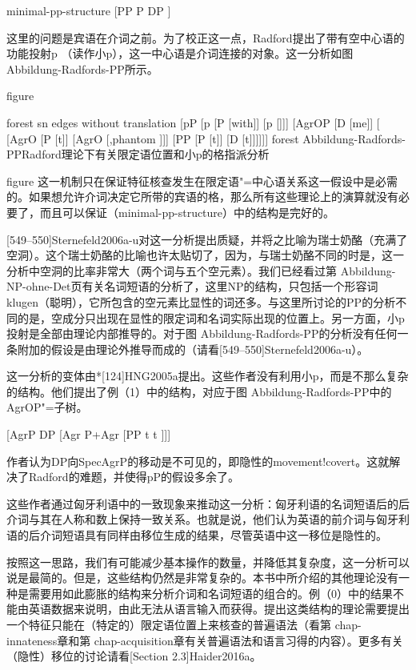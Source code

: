 minimal-pp-structure
[PP P DP ] 

这里的问题是宾语在介词之前。为了校正这一点，Radford提出了带有空中心语的功能投射p （读作小p），这一中心语是介词连接的对象。这一分析如图 Abbildung-Radfords-PP所示。


figure

forest
sn edges without translation
[pP
   [p
	[P [with]]
	[p []]]
   [AgrOP
	[D [me]]
	[
		[AgrO
			[P [t]]
			[AgrO [,phantom  ]]]
		[PP
			[P [t]]
			[D [t]]]]]]
forest
Abbildung-Radfords-PPRadford理论下有关限定语位置和小p的格指派分析

figure
这一机制只在保证特征核查发生在限定语"=中心语关系这一假设中是必需的。如果想允许介词决定它所带的宾语的格，那么所有这些理论上的演算就没有必要了，而且可以保证（minimal-pp-structure）中的结构是完好的。




[549--550]Sternefeld2006a-u对这一分析提出质疑，并将之比喻为瑞士奶酪（充满了空洞）。这个瑞士奶酪的比喻也许太贴切了，因为，与瑞士奶酪不同的时是，这一分析中空洞的比率非常大（两个词与五个空元素）。我们已经看过第 Abbildung-NP-ohne-Det页有关名词短语的分析了，这里NP的结构，只包括一个形容词klugen（聪明），它所包含的空元素比显性的词还多。与这里所讨论的PP的分析不同的是，空成分只出现在显性的限定词和名词实际出现的位置上。另一方面，小p投射是全部由理论内部推导的。对于图 Abbildung-Radfords-PP的分析没有任何一条附加的假设是由理论外推导而成的（请看[549--550]Sternefeld2006a-u）。








这一分析的变体由*[124]HNG2005a提出。这些作者没有利用小p，而是不那么复杂的结构。他们提出了例（1）中的结构，对应于图 Abbildung-Radfords-PP中的AgrOP"=子树。



[AgrP DP [Agr P+Agr [PP t t ]]]

作者认为DP向SpecAgrP的移动是不可见的，即隐性的movement!covert。这就解决了Radford的难题，并使得pP的假设多余了。



这些作者通过匈牙利语中的一致现象来推动这一分析：匈牙利语的名词短语后的后介词与其在人称和数上保持一致关系。也就是说，他们认为英语的前介词与匈牙利语的后介词短语具有同样由移位生成的结果，尽管英语中这一移位是隐性的。





按照这一思路，我们有可能减少基本操作的数量，并降低其复杂度，这一分析可以说是最简的。但是，这些结构仍然是非常复杂的。本书中所介绍的其他理论没有一种是需要用如此膨胀的结构来分析介词和名词短语的组合的。例（0）中的结果不能由英语数据来说明，由此无法从语言输入而获得。提出这类结构的理论需要提出一个特征只能在（特定的）限定语位置上来核查的普遍语法（看第 chap-innateness章和第 chap-acquisition章有关普遍语法和语言习得的内容）。更多有关（隐性）移位的讨论请看[Section 2.3]Haider2016a。









